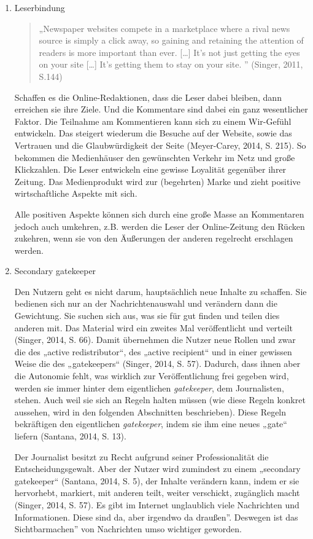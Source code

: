\begin{enumerate}
\item{Leserbindung}

\begin{quote}
„Newspaper websites compete in a marketplace where a rival news source is simply
a click away, so gaining and retaining the attention of readers is more
important than ever. [\ldots] It’s not just getting the eyes on your site
[\ldots] It’s getting them to stay on your site. ” (Singer, 2011, S.144)
\end{quote}

Schaffen es die Online-Redaktionen, dass die Leser dabei bleiben, dann erreichen
sie ihre Ziele. Und die Kommentare sind dabei ein ganz wesentlicher Faktor. Die
Teilnahme am Kommentieren kann sich zu einem Wir-Gefühl entwickeln. Das steigert
wiederum die Besuche auf der Website, sowie das Vertrauen und die
Glaubwürdigkeit der Seite (Meyer-Carey, 2014, S. 215). So bekommen die
Medienhäuser den gewünschten Verkehr im Netz und große Klickzahlen. Die Leser
entwickeln eine gewisse Loyalität gegenüber ihrer Zeitung. Das Medienprodukt
wird zur (begehrten) Marke und zieht positive wirtschaftliche Aspekte mit sich.

Alle positiven Aspekte können sich durch eine große Masse an Kommentaren jedoch
auch umkehren, z.B. werden die Leser der Online-Zeitung den Rücken zukehren,
wenn sie von den Äußerungen der anderen regelrecht erschlagen werden.


\item{Secondary gatekeeper}


Den Nutzern geht es nicht darum, hauptsächlich neue Inhalte zu schaffen. Sie
bedienen sich nur an der Nachrichtenauswahl und verändern dann die Gewichtung. 
Sie suchen sich aus, was sie für gut finden und teilen dies anderen mit. Das Material wird
ein zweites Mal veröffentlicht und verteilt (Singer, 2014, S. 66).
Damit übernehmen die Nutzer neue Rollen und zwar die des „active redistributor“, des
„active recipient“ und in einer gewissen Weise die des „gatekeepers“ (Singer,
2014, S. 57). Dadurch, dass ihnen aber die Autonomie fehlt, was wirklich zur
Veröffentlichung frei gegeben wird, werden sie immer hinter dem eigentlichen
\emph{gatekeeper}, dem Journalisten, stehen. Auch weil sie sich an Regeln halten müssen
(wie diese Regeln konkret aussehen, wird in den folgenden Abschnitten
beschrieben). Diese Regeln bekräftigen den eigentlichen \emph{gatekeeper}, indem sie
ihm eine neues „gate“ liefern (Santana, 2014, S. 13).

Der Journalist besitzt zu Recht aufgrund seiner Professionalität die
Entscheidungsgewalt. Aber der Nutzer wird zumindest zu einem „secondary
gatekeeper“ (Santana, 2014, S. 5), der Inhalte verändern kann, indem er sie
hervorhebt, markiert, mit anderen teilt, weiter verschickt, zugänglich
macht (Singer, 2014, S. 57). 
Es gibt im Internet unglaublich viele Nachrichten und Informationen. Diese sind da,
aber irgendwo \glqq da draußen''. Deswegen ist das \glqq Sichtbarmachen'' von Nachrichten
umso wichtiger geworden. 


\end{enumerate}
